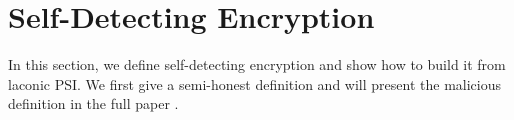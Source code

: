 


\section{Self-Detecting Encryption}

In this section, we define self-detecting encryption and show how to build it from laconic PSI. We first give a semi-honest definition and will present the malicious definition in the full paper \cite{EPRINT:2021:728}.

